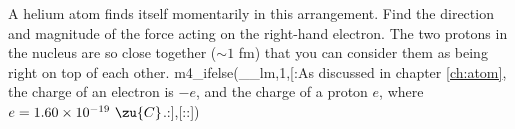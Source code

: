 A helium atom finds itself momentarily in this
        arrangement.  Find the direction and magnitude of the force
        acting on the right-hand electron.  The two protons in the
        nucleus are so close together ($\sim1$ fm) that you can
        consider them as being right on top of each other.
m4_ifelse(__lm,1,[:As discussed in chapter \ref{ch:atom}, the
charge of an electron is $-e$, and the charge of a proton $e$,
where $e=1.60\times10^{-19}\ \zu{C}$.:],[::])
\answercheck
